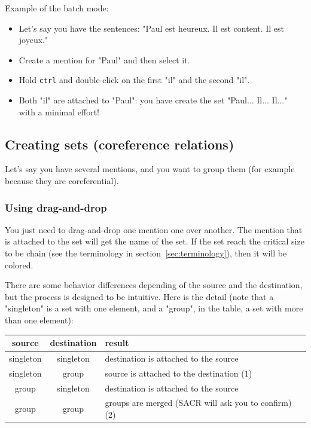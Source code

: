 \documentclass[12pt]{article}
\begin{document}
Example of the batch mode:
\begin{itemize}
   \item Let's say you have the sentences: "Paul est heureux.  Il est
   content. Il est joyeux."
   \item Create a mention for "Paul" and then select it.
   \item Hold \verb|ctrl| and double-click on the first "il" and the second
   "il".
   \item Both "il" are attached to "Paul": you have create the set "Paul...
   Il... Il..." with a minimal effort!
\end{itemize}



 \subsection{Creating sets (coreference relations)}

Let's say you have several mentions, and you want to group them (for example
because they are coreferential).

 \subsubsection{Using drag-and-drop}

You just need to drag-and-drop one mention one over another.  The mention
that is attached to the set will get the name of the set.  If the set reach
the critical size to be chain (see the terminology in
section~\ref{sec:terminology}), then it will be colored.

There are some behavior differences depending of the source and the
destination, but the process is designed to be intuitive.  Here is the
detail (note that a "singleton" is a set with one element, and a "group", in
the table, a set with more than one element):

\begin{tabular}{c|c|m{10.5cm}}
\textbf{source} & \textbf{destination}& \textbf{result}\\\hline
singleton & singleton& destination is attached to the source\\\hline
singleton & group & source is attached to the destination (1)\\\hline
group & singleton & destination is attached to the source\\\hline
group & group & groups are merged (SACR will ask you to confirm) (2)\\
\end{tabular}
\end{document}
